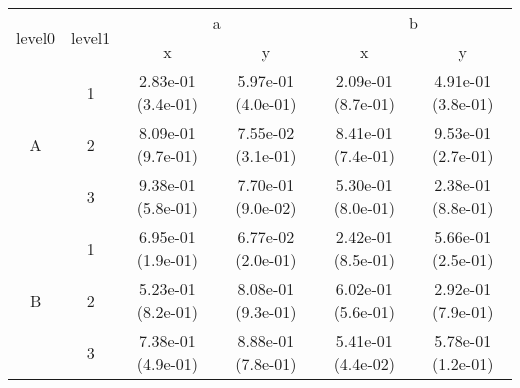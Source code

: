 \begin{tabular}{cccccc}
\toprule
\multirow{2}{*}{level0} & \multirow{2}{*}{level1}&\multicolumn{2}{c}{a}&\multicolumn{2}{c}{b}\tabularnewline
\cmidrule(lr){3-4}
\cmidrule(lr){5-6}
&&x&y&x&y\tabularnewline
\midrule
\multirow{3}{*}{A}&1& 2.83e-01 (3.4e-01)& 5.97e-01 (4.0e-01)& 2.09e-01 (8.7e-01)& 4.91e-01 (3.8e-01)\tabularnewline
&2& 8.09e-01 (9.7e-01)& 7.55e-02 (3.1e-01)& 8.41e-01 (7.4e-01)& 9.53e-01 (2.7e-01)\tabularnewline
&3& 9.38e-01 (5.8e-01)& 7.70e-01 (9.0e-02)& 5.30e-01 (8.0e-01)& 2.38e-01 (8.8e-01)\tabularnewline
\midrule
\multirow{3}{*}{B}&1& 6.95e-01 (1.9e-01)& 6.77e-02 (2.0e-01)& 2.42e-01 (8.5e-01)& 5.66e-01 (2.5e-01)\tabularnewline
&2& 5.23e-01 (8.2e-01)& 8.08e-01 (9.3e-01)& 6.02e-01 (5.6e-01)& 2.92e-01 (7.9e-01)\tabularnewline
&3& 7.38e-01 (4.9e-01)& 8.88e-01 (7.8e-01)& 5.41e-01 (4.4e-02)& 5.78e-01 (1.2e-01)\tabularnewline
\bottomrule
\end{tabular}
